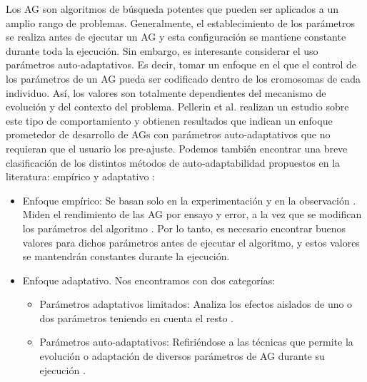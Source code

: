 Los AG son algoritmos de búsqueda potentes que pueden ser aplicados a un amplio rango de problemas. 
Generalmente, el establecimiento de los parámetros se realiza antes de ejecutar un AG y esta configuración se mantiene constante durante toda la ejecución. 
Sin embargo, es interesante considerar el uso parámetros auto-adaptativos. 
Es decir, tomar un enfoque en el que el control de los parámetros de un AG pueda ser codificado dentro de los cromosomas de cada individuo. 
Así, los valores son totalmente dependientes del mecanismo de evolución y del contexto del problema. 
Pellerin et al. \parencite{pellerinSelfadaptiveParametersGenetic2004} realizan  un estudio sobre este tipo de comportamiento y obtienen resultados que indican un enfoque prometedor de desarrollo de AGs con parámetros auto-adaptativos que no requieran que el usuario los pre-ajuste. 
Podemos también encontrar una breve clasificación de los distintos métodos de auto-adaptabilidad propuestos en la literatura: empírico y adaptativo \parencite{eibenParameterControlEvolutionary1999} \parencite{loboOverviewParameterlessGenetic2008}: 
\begin{itemize}
	\item Enfoque empírico: Se basan solo en la experimentación y en la observación . 
	Miden el rendimiento de las AG por ensayo y error, a la vez que se modifican los parámetros del algoritmo \parencite{eibenParameterControlEvolutionary1999}. 
	Por lo tanto, es necesario encontrar buenos valores para dichos parámetros antes de ejecutar el algoritmo, y estos valores se mantendrán constantes durante la ejecución. 
	\item Enfoque adaptativo. 
	Nos encontramos con dos categorías:
	\begin{itemize}
		\item Parámetros adaptativos limitados: Analiza los efectos aislados de uno o dos parámetros teniendo en cuenta el resto \parencite{lisParallelGeneticAlgorithm1996}. 
		\item Parámetros auto-adaptativos: Refiriéndose a las técnicas que permite la evolución o adaptación de diversos parámetros de AG durante su ejecución \parencite{grefenstetteOptimizationControlParameters1986} \parencite{phamCompetitiveEvolutionNatural1994}.
	\end{itemize}
\end{itemize}

